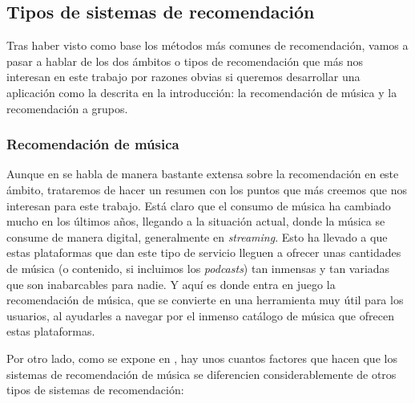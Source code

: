 \subsection{Tipos de sistemas de recomendación\label{SEC:TIPOS_RECOMENDADORES}}

Tras haber visto como base los métodos más comunes de recomendación, vamos a pasar a hablar de los dos ámbitos o tipos de recomendación que más nos
interesan en este trabajo por razones obvias si queremos desarrollar una aplicación como la descrita en la introducción: 
la recomendación de música y la recomendación a grupos.
    
\subsubsection{Recomendación de música\label{SEC:RECOMENDACION_MUSICA}}

Aunque en \cite{musicrecommender} se habla de manera bastante extensa sobre la recomendación en este ámbito, trataremos de hacer un resumen con los puntos que 
más creemos que nos interesan para este trabajo. Está claro que el consumo de música ha cambiado mucho en los últimos años, llegando a la situación actual,
donde la música se consume de manera digital, generalmente en \textit{streaming}. Esto ha llevado a que estas plataformas que dan este tipo de servicio 
lleguen a ofrecer unas cantidades de música (o contenido, si incluimos los \textit{podcasts}) tan inmensas y tan variadas que son inabarcables para nadie. 
Y aquí es donde entra en juego la recomendación de música, que se convierte en una herramienta muy útil para los usuarios, al ayudarles a navegar por el inmenso
catálogo de música que ofrecen estas plataformas.

Por otro lado, como se expone en \cite{musicrecommender}, hay unos cuantos factores que hacen que los sistemas de recomendación de música se diferencien considerablemente 
de otros tipos de sistemas de recomendación:

